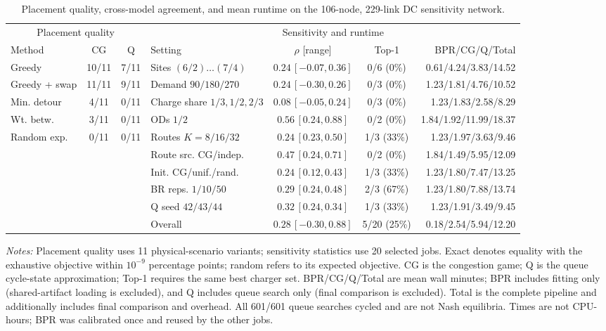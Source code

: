 \begin{table}[t]
  \centering
  \caption{Placement quality, cross-model agreement, and mean runtime on the 106-node, 229-link DC sensitivity network.}
  \label{tab:rebuttal_sensitivity}
  \normalsize
  \setlength{\tabcolsep}{1pt}
  \renewcommand{\arraystretch}{1.10}
  \begin{tabular*}{\textwidth}{@{\extracolsep{\fill}}lcc@{\hspace{0.2em}}lccr@{}}
    \toprule
    \multicolumn{3}{c}{Placement quality} & \multicolumn{4}{c}{Sensitivity and runtime} \\
    \cmidrule(lr){1-3} \cmidrule(lr){4-7}
    Method & CG & Q & Setting & $\rho$ [range] & Top-1 & BPR/CG/Q/Total \\
    \midrule
    Greedy & 10/11 & 7/11 & Sites $(6/2)\ldots(7/4)$ & $0.24\,[-0.07,0.36]$ & 0/6 (0\%) & 0.61/4.24/3.83/14.52 \\
    Greedy + swap & 11/11 & 9/11 & Demand $90/180/270$ & $0.24\,[-0.30,0.26]$ & 0/3 (0\%) & 1.23/1.81/4.76/10.52 \\
    Min. detour & 4/11 & 0/11 & Charge share $1/3,1/2,2/3$ & $0.08\,[-0.05,0.24]$ & 0/3 (0\%) & 1.23/1.83/2.58/8.29 \\
    Wt. betw. & 3/11 & 0/11 & ODs $1/2$ & $0.56\,[0.24,0.88]$ & 0/2 (0\%) & 1.84/1.92/11.99/18.37 \\
    Random exp. & 0/11 & 0/11 & Routes $K=8/16/32$ & $0.24\,[0.23,0.50]$ & 1/3 (33\%) & 1.23/1.97/3.63/9.46 \\
     &  &  & Route src. CG/indep. & $0.47\,[0.24,0.71]$ & 0/2 (0\%) & 1.84/1.49/5.95/12.09 \\
     &  &  & Init. CG/unif./rand. & $0.24\,[0.12,0.43]$ & 1/3 (33\%) & 1.23/1.80/7.47/13.25 \\
     &  &  & BR reps. $1/10/50$ & $0.29\,[0.24,0.48]$ & 2/3 (67\%) & 1.23/1.80/7.88/13.74 \\
     &  &  & Q seed $42/43/44$ & $0.32\,[0.24,0.34]$ & 1/3 (33\%) & 1.23/1.91/3.49/9.45 \\
    \cmidrule(lr){4-7}
     &  &  & Overall & $0.28\,[-0.30,0.88]$ & 5/20 (25\%) & 0.18/2.54/5.94/12.20 \\
    \bottomrule
  \end{tabular*}
  \vspace{3pt}
  \begin{minipage}{0.985\textwidth}
    \footnotesize
    \textit{Notes:} Placement quality uses 11 physical-scenario variants; sensitivity statistics use 20 selected jobs. Exact denotes equality with the exhaustive objective within $10^{-9}$ percentage points; random refers to its expected objective. CG is the congestion game; Q is the queue cycle-state approximation; Top-1 requires the same best charger set. BPR/CG/Q/Total are mean wall minutes; BPR includes fitting only (shared-artifact loading is excluded), and Q includes queue search only (final comparison is excluded). Total is the complete pipeline and additionally includes final comparison and overhead. All 601/601 queue searches cycled and are not Nash equilibria. Times are not CPU-hours; BPR was calibrated once and reused by the other jobs.
  \end{minipage}
\end{table}
